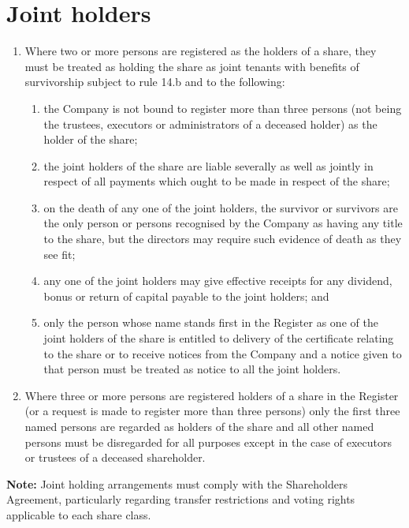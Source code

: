 \section{Joint holders}

\begin{enumerate}[label=(\alph*)]
    \item Where two or more persons are registered as the holders of a share, they must be treated as holding the share as joint tenants with benefits of survivorship subject to rule 14.b and to the following:
    \begin{enumerate}[label=(\roman*)]
        \item the Company is not bound to register more than three persons (not being the trustees, executors or administrators of a deceased holder) as the holder of the share;
        \item the joint holders of the share are liable severally as well as jointly in respect of all payments which ought to be made in respect of the share;
        \item on the death of any one of the joint holders, the survivor or survivors are the only person or persons recognised by the Company as having any title to the share, but the directors may require such evidence of death as they see fit;
        \item any one of the joint holders may give effective receipts for any dividend, bonus or return of capital payable to the joint holders; and
        \item only the person whose name stands first in the Register as one of the joint holders of the share is entitled to delivery of the certificate relating to the share or to receive notices from the Company and a notice given to that person must be treated as notice to all the joint holders.
    \end{enumerate}
    
    \item Where three or more persons are registered holders of a share in the Register (or a request is made to register more than three persons) only the first three named persons are regarded as holders of the share and all other named persons must be disregarded for all purposes except in the case of executors or trustees of a deceased shareholder.
\end{enumerate}

\textbf{Note:} Joint holding arrangements must comply with the Shareholders Agreement, particularly regarding transfer restrictions and voting rights applicable to each share class. 